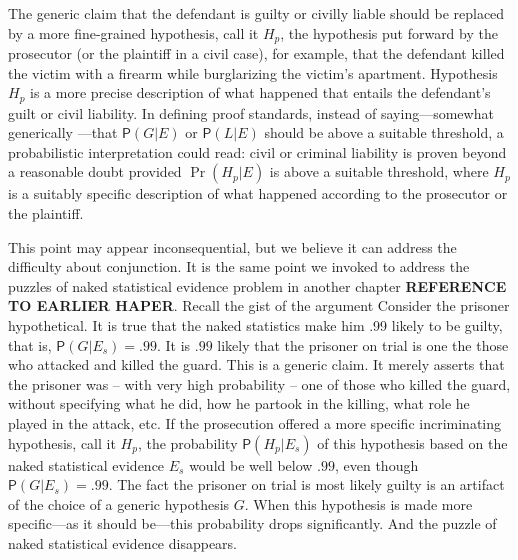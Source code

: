 \documentclass[
  10pt,
  dvipsnames,enabledeprecatedfontcommands]{scrartcl}
\newcommand{\pr}[1]{\mathsf{P}(#1)}
\begin{document}
The generic claim that the defendant is guilty or civilly liable should
be replaced by a more fine-grained hypothesis, call it \(H_p\), the
hypothesis put forward by the prosecutor (or the plaintiff in a civil
case), for example, that the defendant killed the victim with a firearm
while burglarizing the victim's apartment. Hypothesis \(H_p\) is a more
precise description of what happened that entails the defendant's guilt
or civil liability. In defining proof standards, instead of
saying---somewhat generically ---that \(\pr{G \vert E}\) or
\(\pr{L \vert E}\) should be above a suitable threshold, a probabilistic
interpretation could read: civil or criminal liability is proven beyond
a reasonable doubt provided \(\Pr(H_p \vert E)\) is above a suitable
threshold, where \(H_p\)is a suitably specific description of what
happened according to the prosecutor or the plaintiff.

This point may appear inconsequential, but we believe it can address the
difficulty about conjunction. It is the same point we invoked to address
the puzzles of naked statistical evidence problem in another chapter
\textbf{REFERENCE TO EARLIER HAPER}. Recall the gist of the argument
Consider the prisoner hypothetical. It is true that the naked statistics
make him .99 likely to be guilty, that is, \(\pr{G \vert E_s} =.99\). It
is \(.99\) likely that the prisoner on trial is one the those who
attacked and killed the guard. This is a generic claim. It merely
asserts that the prisoner was -- with very high probability -- one of
those who killed the guard, without specifying what he did, how he
partook in the killing, what role he played in the attack, etc. If the
prosecution offered a more specific incriminating hypothesis, call it
\(H_p\), the probability \(\pr{H_p \vert E_{s}}\) of this hypothesis
based on the naked statistical evidence \(E_s\) would be well below
\(.99\), even though \(\pr{G \vert E_s}=.99\). The fact the prisoner on
trial is most likely guilty is an artifact of the choice of a generic
hypothesis \(G\). When this hypothesis is made more specific---as it
should be---this probability drops significantly. And the puzzle of
naked statistical evidence disappears.
\end{document}
